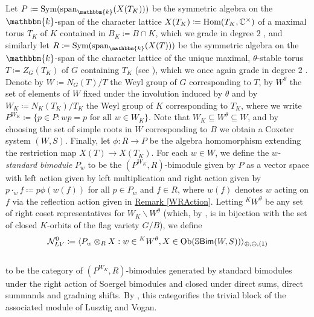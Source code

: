 \noindent %
Let $P \coloneqq \textup{Sym}(\textup{span}_\mathbbm{k}(X(T_K)))$ be the symmetric algebra on the $\mathbbm{k}$-span of the character lattice $X(T_K) \coloneqq \textnormal{Hom}(T_K, \mathbb{C}^\times)$ of a maximal torus $T_K$ of $K$ contained in $B_K \coloneqq B \cap K$, which we grade in degree $2$%
, and similarly let $R \coloneqq \textup{Sym}(\textup{span}_\mathbbm{k}(X(T)))$ be the symmetric algebra on the $\mathbbm{k}$-span of the character lattice of the unique maximal, $\theta$-stable torus $T \coloneqq Z_G(T_K)$ of $G$ containing $T_K$ (see \cite[Lemma 6.1.2]{LR22}), which we once again grade in degree $2$%
. Denote by $W \coloneqq N_G(T)/T$ the Weyl group of $G$ corresponding to $T$, by $W^\theta$ the set of elements of $W$ fixed under the involution induced by $\theta$ and by $W_K \coloneqq N_K(T_K)/T_K$ the Weyl group of $K$ corresponding to $T_K$, where we write $P^{W_K} \coloneqq \{p \in P : wp = p\text{ for all }w \in W_K\}$. Note that $W_K \subseteq W^\theta \subseteq W$, and by choosing the set of simple roots in $W$ corresponding to $B$ we obtain a Coxeter system $(W, S)$. Finally, let $\phi : R \to P$ be the algebra homomorphism extending the restriction map $X(T) \to X(T_K)$. For each $w \in W$, we define the {\em $w$-standard bimodule} $P_w$ to be the $(P^{W_K}, R)$-bimodule given by $P$ as a vector space with left action given by left multiplication and right action given by $p\cdot_w f \coloneqq p\phi(w(f))$ for all $p \in P_w$ and $f \in R$, where $w(f)$ denotes $w$ acting on $f$ via the reflection action given in \hyperref[WRAction]{Remark \ref*{WRAction}}. Letting ${}^KW^\theta$ be any set of right coset representatives for $W_K\backslash W^\theta$ (which, by \cite[Corollary 6.1.6]{LR22}, is in bijection with the set of closed $K$-orbits of the flag variety $G/B$), we define\\[-1.2\linespacing]
\begin{align*}
\begin{split}
\mathcal{N}_{LV}^0 \coloneqq \langle P_w \otimes_R X : w \in {}^KW^\theta, X \in \textnormal{Ob}(\mathbb{S}\textnormal{\textsf{Bim}}(W, S))\rangle_{\oplus,\ominus,(1)}
\end{split}
\end{align*}
\noindent\\[-1.2\linespacing] to be the category of $(P^{W_K}, R)$-bimodules generated by standard bimodules under the right action of Soergel bimodules and closed under direct sums, direct summands and gradning shifts. By \cite[Theorem 1.3.1]{LR22}, this categorifies the trivial block of the associated module of Lusztig and Vogan.\\

